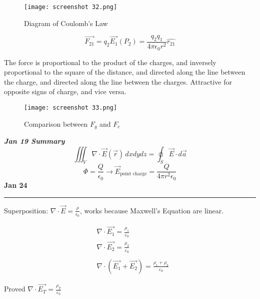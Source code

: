 \documentclass[svgnames]{article}   	%
\begin{document}
\begin{figure}[H]
  \centering
    \texttt{[image: screenshot 32.png]}
    \caption{Diagram of Coulomb's Law}
\end{figure}



\begin{tcolorbox}[title = Coulomb's Law]
\[
  \vec{F_{21}} = q_2 \vec{E_1}(P_2) = \frac{q_2q_1}{4 \pi \epsilon_0 r^2}
  \hat{r_{21}}
\]
\end{tcolorbox}

The force is proportional to the product of the charges, and inversely
proportional to the square of the distance, and directed along the line between
the charge, and directed along the line between the charges. Attractive for
opposite signs of charge, and vice versa. 


\begin{figure}[H]
  \centering
    \texttt{[image: screenshot 33.png]}
    \caption{Comparison between $F_g$ and $F_c$}
\end{figure} 

\newpage
\textit{ \textbf{Jan 19 Summary}} 
\vspace{5px} \[
  \iiint_V \nabla \cdot \vec{E} (\vec{r} ) \, dxdydz = \oint_S \vec{E} \cdot
  d\vec{a}
\] \vspace{5px}
\vspace{5px} \[
  \Phi = \frac{Q}{\epsilon_0} \rightarrow \vec{E}_{\text{point charge}}
  = \frac{Q}{4\pi r^2 \epsilon_0}
\] \vspace{5px}
\newpage
\noindent \textbf{Jan 24} \hrule
\vspace{10px} 

\begin{tcolorbox}[colback = red!5!white, colframe = red!50!black, title
  = Calculating $\vec{E}$ for arbitrary $\rho(\vec{r)}$]
  
  Superposition: $\nabla \cdot \vec{E} = \frac{\rho}{\epsilon_0}$, works
  because Maxwell's Equation are linear.

  \begin{align*}
    &\nabla \cdot \vec{E_1} = \frac{\rho_1}{\varepsilon_0} \\
    &\nabla \cdot \vec{E_2} = \frac{\rho_2}{\varepsilon_0} \\\\
    &\nabla \cdot (\vec{E_1} + \vec{E_2}) = \frac{\rho_1 + \rho_2}{\varepsilon_0}
  \end{align*}

  Proved $\nabla \cdot \vec{E_T} = \frac{\rho_T}{\varepsilon_0}$
\end{tcolorbox}
\end{document}
